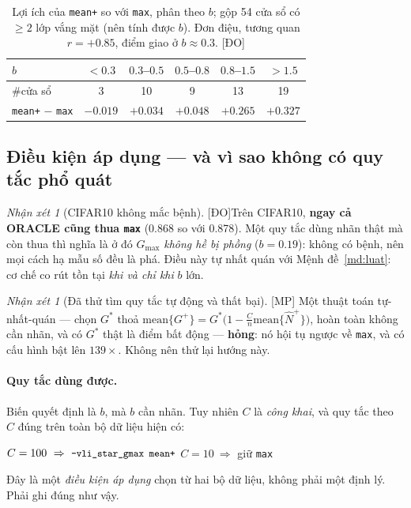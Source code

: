 \documentclass[11pt,a4paper]{article}
\theoremstyle{remark}
\newtheorem{nhanxet}[dinhly]{Nhận xét}
\newcommand{\code}[1]{\texttt{\small #1}}
\newcommand{\DO}{\textsf{[ĐO]}}
\newcommand{\MP}{\textsf{[MP]}}
\begin{document}
\begin{table}[htbp]
\centering
\caption{Lợi ích của \code{mean+} so với \code{max}, phân theo $b$; gộp 54 cửa
sổ có $\ge2$ lớp vắng mặt (nên tính được $b$). Đơn điệu, tương quan
$r=+0.85$, điểm giao ở $b\approx0.3$. \DO}
\label{tab:crossover}
\small
\begin{tabular}{@{}lccccc@{}}
\toprule
$b$ & $<0.3$ & $0.3$--$0.5$ & $0.5$--$0.8$ & $0.8$--$1.5$ & $>1.5$ \\
\midrule
\#cửa sổ & 3 & 10 & 9 & 13 & 19 \\
\texttt{mean+} $-$ \texttt{max} & $-0.019$ & $+0.034$ & $+0.048$ & $+0.265$ & $+0.327$ \\
\bottomrule
\end{tabular}
\end{table}

\subsection{Điều kiện áp dụng --- và vì sao không có quy tắc phổ quát}

\begin{nhanxet}[CIFAR10 không mắc bệnh] \DO\label{nx:cifar10}
Trên CIFAR10, \textbf{ngay cả ORACLE cũng thua \code{max}} (0.868 so với 0.878).
Một quy tắc dùng nhãn thật mà còn thua thì nghĩa là ở đó $G_{\max}$ \emph{không
hề bị phồng} ($b=0.19$): không có bệnh, nên mọi cách hạ mẫu số đều là phá. Điều
này tự nhất quán với Mệnh đề~\ref{md:luat}: cơ chế co rút tồn tại \emph{khi và
chỉ khi} $b$ lớn.
\end{nhanxet}

\begin{nhanxet}[Đã thử tìm quy tắc tự động và thất bại] \MP
Một thuật toán tự-nhất-quán --- chọn $G^*$ thoả
$\mathrm{mean}\{G^+\}=G^*\big(1-\tfrac Cn\mathrm{mean}\{\hat N^+\}\big)$, hoàn
toàn không cần nhãn, và có $G^*$ thật là điểm bất động --- \textbf{hỏng}: nó hội
tụ ngược về \code{max}, và có cấu hình bật lên $139\times$. Không nên thử lại
hướng này.
\end{nhanxet}

\paragraph{Quy tắc dùng được.} Biến quyết định là $b$, mà $b$ cần nhãn. Tuy
nhiên $C$ là \emph{công khai}, và quy tắc theo $C$ đúng trên toàn bộ dữ liệu
hiện có:
\begin{center}
$C=100\ \Rightarrow\ \code{--vli\_star\_gmax mean+}$
\qquad\qquad
$C=10\ \Rightarrow$ giữ \code{max}
\end{center}
Đây là một \emph{điều kiện áp dụng} chọn từ hai bộ dữ liệu, không phải một định
lý. Phải ghi đúng như vậy.
\end{document}
